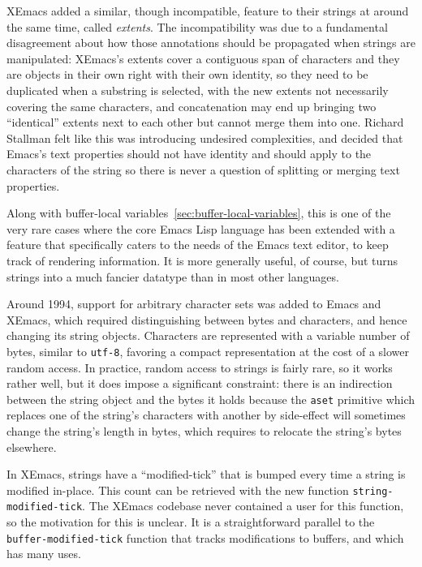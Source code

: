 \documentclass[format=acmsmall, review]{acmart}
\newcommand \Elisp {Emacs Lisp}
\begin{document}
XEmacs added a similar, though incompatible, feature to their strings at
around the same time, called \emph{extents}.  The incompatibility was due to
a fundamental disagreement about how those annotations should be propagated
when strings are manipulated: XEmacs's extents cover a contiguous span of
characters and they are objects in their own right with their own identity,
so they need to be duplicated when a substring is selected, with the new
extents not necessarily covering the same characters, and concatenation may
end up bringing two ``identical'' extents next to each other but cannot
merge them into one.  Richard Stallman felt like this was introducing
undesired complexities, and decided that Emacs's text properties should not
have identity and should apply to the characters of the string so there is
never a question of splitting or merging text properties.

Along with buffer-local variables~\ref{sec:buffer-local-variables}, this is one of
the very rare cases where the core \Elisp{} language has been extended with
a feature that specifically caters to the needs of the Emacs text editor, to
keep track of rendering information.  It is more generally useful, of
course, but turns strings into a much fancier datatype than in most
other languages.

Around 1994, support for arbitrary character sets was added to Emacs and
XEmacs, which required distinguishing between bytes and characters, and
hence changing its string objects.  Characters are represented with
a variable number of bytes, similar to \texttt{utf-8}, favoring a compact
representation at the cost of a slower random access.  In practice, random
access to strings is fairly rare, so it works rather well, but it does
impose a significant constraint: there is an indirection between the string
object and the bytes it holds because the \texttt{aset} primitive which
replaces one of the string's characters with another by side-effect will
sometimes change the string's length in bytes, which requires to relocate
the string's bytes elsewhere.

In XEmacs, strings have a ``modified-tick'' that is bumped every time
a string is modified in-place.  This count can be retrieved with the
new function \texttt{string-modified-tick}.  The XEmacs codebase never
contained a user for this function, so the motivation for this is
unclear.  It is a straightforward parallel to the
\texttt{buffer-modified-tick} function that tracks modifications to
buffers, and which has many uses.
\end{document}
